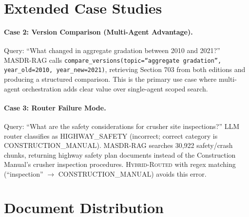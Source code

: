 \documentclass{article}
\newcommand{\systemname}{\textsc{MASDR-RAG}}
\newcommand{\hybridname}{\textsc{Hybrid-Routed}}
\begin{document}
\section{Extended Case Studies}
\label{app:case_studies}
\paragraph{Case 2: Version Comparison (Multi-Agent Advantage).} Query: ``What changed in aggregate gradation between 2010 and 2021?'' \systemname{} calls \texttt{compare\_versions(topic=``aggregate gradation'', year\_old=2010, year\_new=2021)}, retrieving Section 703 from both editions and producing a structured comparison. This is the primary use case where multi-agent orchestration adds clear value over single-agent scoped search.

\paragraph{Case 3: Router Failure Mode.} Query: ``What are the safety considerations for crusher site inspections?'' LLM router classifies as HIGHWAY\_SAFETY (incorrect; correct category is CONSTRUCTION\_MANUAL). \systemname{} searches 30,922 safety/crash chunks, returning highway safety plan documents instead of the Construction Manual's crusher inspection procedures. \hybridname{} with regex matching (``inspection'' $\rightarrow$ CONSTRUCTION\_MANUAL) avoids this error.




\section{Document Distribution}
\label{app:distribution}
\end{document}
